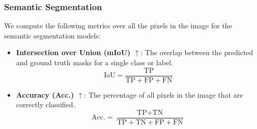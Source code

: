 \subsubsection{Semantic Segmentation}
We compute the following metrics over all the pixels in the image for the semantic segmentation models:
\begin{itemize}
	\item \textbf{Intersection over Union (mIoU) $\uparrow$}: The overlap between the predicted and ground truth masks for a single class or label.
	      \begin{equation}
		      \text{IoU} = \frac{\text{TP}}{\text{TP} + \text{FP} + \text{FN}}
	      \end{equation}

	\item \textbf{Accuracy (Acc.) $\uparrow$}: The percentage of all pixels in the image that are correctly classified.
	      \begin{equation}
		      \text{Acc.} = \frac{\text{TP} + \text{TN}}{\text{TP} + \text{TN} + \text{FP} + \text{FN}}
	      \end{equation}
\end{itemize}

